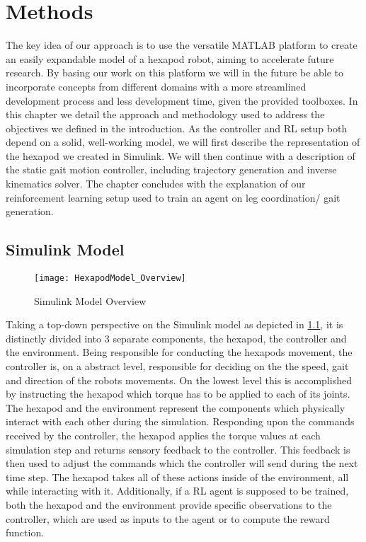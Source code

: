 \chapter{Methods}
\label{ch:methods}

The key idea of our approach is to use the versatile MATLAB platform to create an easily expandable model of a hexapod robot, aiming to accelerate future research.
By basing our work on this platform we will in the future be able to incorporate concepts from different domains with a more streamlined development process and less development time, given the provided toolboxes.
In this chapter we detail the approach and methodology used to address the objectives we defined in the introduction.
As the controller and RL setup both depend on a solid, well-working model, we will first describe the representation of the hexapod we created in Simulink.
We will then continue with a description of the static gait motion controller, including trajectory generation and inverse kinematics solver.
The chapter concludes with the explanation of our reinforcement learning setup used to train an agent on leg coordination/ gait generation.


\section{Simulink Model}

\begin{figure}[h]
	\centerline{\texttt{[image: HexapodModel\_Overview]}}
	\caption{Simulink Model Overview}
	\label{figure: Simulink Model Overview}
\end{figure}

Taking a top-down perspective on the Simulink model as depicted in \ref{figure: Simulink Model Overview}, it is distinctly divided into 3 separate components, the hexapod, the controller and the environment.
Being responsible for conducting the hexapods movement, the controller is, on a abstract level, responsible for deciding on the the speed, gait and direction of the robots movements.
On the lowest level this is accomplished by instructing the hexapod which torque has to be applied to each of its joints. 
The hexapod and the environment represent the components which physically interact with each other during the simulation.
Responding upon the commands received by the controller, the hexapod applies the torque values at each simulation step and returns sensory feedback to the controller.
This feedback is then used to adjust the commands which the controller will send during the next time step.
The hexapod takes all of these actions inside of the environment, all while interacting with it.
Additionally, if a RL agent is supposed to be trained, both the hexapod and the environment provide specific observations to the controller, which are used as inputs to the agent or to compute the reward function. 


